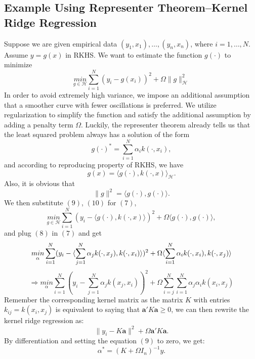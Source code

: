 \subsection{Example Using Representer Theorem--Kernel Ridge Regression}
Suppose we are given empirical data $(y_1,x_1),\dots,(y_n,x_n)$, where $i = 1, \dots, N$. Assume $y=g(x)$ in RKHS. We want to estimate the function $g(\cdot)$ to minimize
\begin{equation}
    \underset{g\in\mathcal{H}}{min}\sum_{i=1}^N(y_i-g(x_i))^2+\Omega\parallel g\parallel_\mathcal{H}^2
\end{equation}
In order to avoid extremely high variance, we impose an additional assumption 
that a smoother curve with fewer oscillations is preferred. We utilize regularization to simplify the function and satisfy the additional assumption by adding a penalty term $\Omega$. Luckily, the representer theorem already tells us that the least squared problem always has a solution of the form 
\begin{equation}
    g(\cdot)^{*}=\sum_{i=1}^N\alpha_i k(\cdot,x_i),
\end{equation}
and according to reproducing property of RKHS, we have
\begin{equation}
    g(x)=\langle g(\cdot), k(\cdot, x)\rangle_\mathcal{H}.
\end{equation}
Also, it is obvious that
\begin{equation}
    \parallel g \parallel^2=\langle g(\cdot),g(\cdot)\rangle.
\end{equation}
We then substitute $(9)$, $(10)$ for $(7)$,
\begin{equation*}
    \underset{g\in\mathcal{H}}{min}\sum_{i=1}^N(y_i-\langle g(\cdot),k(\cdot, x)\rangle)^2+\Omega\langle g(\cdot),g(\cdot)\rangle,
\end{equation*}
and plug $(8)$ in $(7)$ and get
\begin{equation*}
    \underset{\alpha}{min}\sum_{i=1}^N(y_i-\langle \sum_{j=1}^N\alpha_j k(\cdot, x_j),k(\cdot,x_i)\rangle)^2+\Omega\langle \sum_{i=1}^N\alpha_i k(\cdot, x_i),k(\cdot,x_j)\rangle\\
\end{equation*}
\begin{equation*}
    \Rightarrow\underset{\alpha}{min}\sum_{i=1}^N(y_i-\sum_{j=1}^N\alpha_j k(x_j,x_i))^2+\Omega\sum_{i=j}^N\sum_{i=1}^N\alpha_j\alpha_i k(x_i,x_j)
\end{equation*}
Remember the corresponding kernel matrix as the matrix $K$ with entries $k_{ij}=k(x_i,x_j)$ is equivalent to saying that $\textbf{a}'K \textbf{a}\geq 0$, we can then rewrite the kernel ridge regression as:
\begin{equation*}
    \parallel y_i-K \textbf{a}\parallel^2+\Omega \textbf{a}' K\textbf{a}.
\end{equation*}
By differentiation and setting the equation $(9)$ to zero, we get:
\begin{equation}
    \alpha^{*}=(K+\Omega I_n)^{-1}y.
\end{equation}


